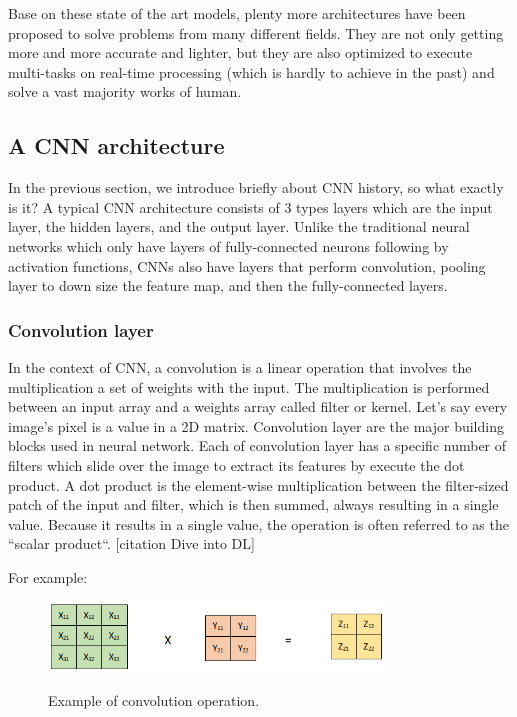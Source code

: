 	Base on these state of the art models, plenty more architectures have been proposed to solve problems from many different fields. They are not only getting more and more accurate and lighter, but they are also optimized to execute multi-tasks on real-time processing (which is hardly to achieve in the past) and solve a vast majority works of human.

\subsection{A CNN architecture}
\label{subsection:CNNarchi}
\noindent

	In the previous section, we introduce briefly about CNN history, so what exactly is it? A typical CNN architecture consists of 3 types layers which are the input layer, the hidden layers, and the output layer. Unlike the traditional neural networks which only have layers of fully-connected neurons following by activation functions, CNNs also have layers that perform convolution, pooling layer to down size the feature map, and then the fully-connected layers.
	
\subsubsection{Convolution layer}
\label{subsubsection:convlayer}
\noindent

	In the context of CNN, a convolution is a linear operation that involves the multiplication a set of weights with the input. The multiplication is performed between an input array and a weights array called filter or kernel. Let’s say every image’s pixel is a value in a 2D matrix. Convolution layer are the major building blocks used in neural network. Each of convolution layer has a specific number of filters which slide over the image to extract its features by execute the dot product. A dot product is the element-wise multiplication between the filter-sized patch of the input and filter, which is then summed, always resulting in a single value. Because it results in a single value, the operation is often referred to as the “scalar product“. [citation Dive into DL]
	
	For example:

	\begin{figure}[H]
		\centering
		{\includegraphics[width=0.8\textwidth]{./hinhanh/chap3/conv_operation.png}}
		\caption{Example of convolution operation.}
	\end{figure}
	
